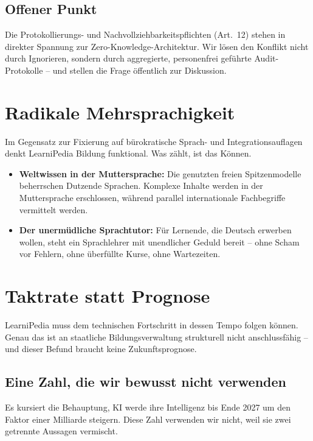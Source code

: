 \documentclass[11pt,a4paper]{article}
\begin{document}
\subsection{Offener Punkt}
Die Protokollierungs- und Nachvollziehbarkeitspflichten (Art.~12) stehen in direkter Spannung zur Zero-Knowledge-Architektur. Wir lösen den Konflikt nicht durch Ignorieren, sondern durch aggregierte, personenfrei geführte Audit-Protokolle -- und stellen die Frage öffentlich zur Diskussion.

\section{Radikale Mehrsprachigkeit}
Im Gegensatz zur Fixierung auf bürokratische Sprach- und Integrationsauflagen denkt LearniPedia Bildung funktional. Was zählt, ist das Können.
\begin{itemize}
    \item \textbf{Weltwissen in der Muttersprache:} Die genutzten freien Spitzenmodelle beherrschen Dutzende Sprachen. Komplexe Inhalte werden in der Muttersprache erschlossen, während parallel internationale Fachbegriffe vermittelt werden.
    \item \textbf{Der unermüdliche Sprachtutor:} Für Lernende, die Deutsch erwerben wollen, steht ein Sprachlehrer mit unendlicher Geduld bereit -- ohne Scham vor Fehlern, ohne überfüllte Kurse, ohne Wartezeiten.
\end{itemize}

\section{Taktrate statt Prognose}
LearniPedia muss dem technischen Fortschritt in dessen Tempo folgen können. Genau das ist an staatliche Bildungsverwaltung strukturell nicht anschlussfähig -- und dieser Befund braucht keine Zukunftsprognose.

\subsection{Eine Zahl, die wir bewusst nicht verwenden}
\label{sec:faktor}
Es kursiert die Behauptung, KI werde ihre Intelligenz bis Ende 2027 um den Faktor einer Milliarde steigern. Diese Zahl verwenden wir nicht, weil sie zwei getrennte Aussagen vermischt.
\end{document}
